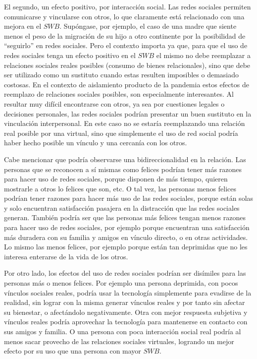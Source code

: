 \documentclass[11pt]{article}
\begin{document}
El segundo, un efecto positivo, por interacción social. Las redes sociales permiten comunicarse y vincularse con otros, lo que claramente está relacionado con una mejora en el $SWB$. Supóngase, por ejemplo, el caso de una madre que siente menos el peso de la migración de su hijo a otro continente por la posibilidad de ``seguirlo'' en redes sociales. Pero el contexto importa ya que, para que el uso de redes sociales tenga un efecto positivo en el $SWB$ el mismo no debe reemplazar a relaciones sociales reales posibles (consumo de bienes relacionales), sino que debe ser utilizado como un sustituto cuando estas resulten imposibles o demasiado costosas. En el contexto de aislamiento producto de la pandemia estos efectos de reemplazo de relaciones sociales posibles, son especialmente interesantes. Al resultar muy difícil encontrarse con otros, ya sea por cuestiones legales o decisiones personales, las redes sociales podrían presentar un buen sustituto en la vinculación interpersonal. En este caso no se estaría reemplazando una relación real posible por una virtual, sino que simplemente el uso de red social podría haber hecho posible un vínculo y una cercanía con los otros. 

Cabe mencionar que podría observarse una bidireccionalidad en la relación. Las personas que se reconocen a sí mismas como felices podrían tener más razones para hacer uso de redes sociales, porque disponen de más tiempo, quieren mostrarle a otros lo felices que son, etc. O tal vez, las personas menos felices podrían tener razones para hacer más uso de las redes sociales, porque están solas y solo encuentran satisfacción pasajera en la distracción que las redes sociales generan. También podría ser que las personas más felices tengan menos razones para hacer uso de redes sociales, por ejemplo porque encuentran una satisfacción más duradera con su familia y amigos en vínculo directo, o en otras actividades. Lo mismo las menos felices, por ejemplo porque están tan deprimidas que no les interesa enterarse de la vida de los otros. 

Por otro lado, los efectos del uso de redes sociales podrían ser disímiles para las personas más o menos felices. Por ejemplo una persona deprimida, con pocos vínculos sociales reales, podría usar la tecnología simplemente para evadirse de la realidad, sin lograr con la misma generar vínculos reales y por tanto sin afectar su bienestar, o afectándolo negativamente. Otra con mejor respuesta subjetiva y vínculos reales podría aprovechar la tecnología para mantenerse en contacto con sus amigos y familia. O una persona con poca interacción social real podría al menos sacar provecho de las relaciones sociales virtuales, logrando un mejor efecto por su uso que una persona con mayor $SWB$. 
\end{document}
